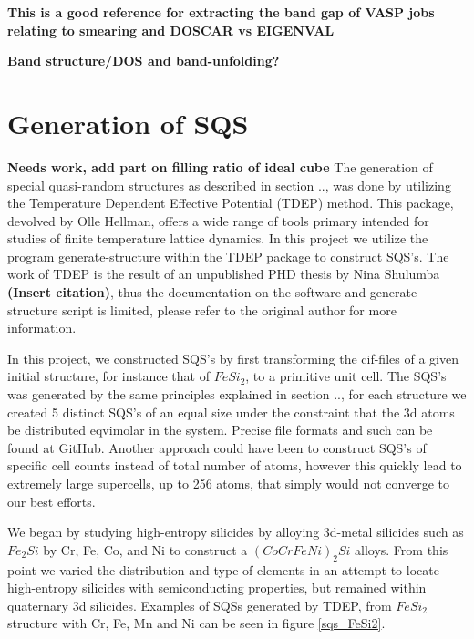 \textbf{This \cite{bandgap_vasp_forum} is a good reference for extracting the band gap of VASP jobs relating to smearing and DOSCAR vs EIGENVAL}

\textbf{Band structure/DOS and band-unfolding?}

\section{Generation of SQS}
\textbf{Needs work, add part on filling ratio of ideal cube}
The generation of special quasi-random structures as described in section .., was done by utilizing the Temperature Dependent Effective Potential (TDEP) method. This package, devolved by Olle Hellman, offers a wide range of tools primary intended for studies of finite temperature lattice dynamics. In this project we utilize the program generate-structure within the TDEP package to construct SQS's. The work of TDEP is the result of an unpublished PHD thesis by Nina Shulumba \textbf{(Insert citation)}, thus the documentation on the software and generate-structure script is limited, please refer to the original author for more information. 

In this project, we constructed SQS's by first transforming the cif-files of a given initial structure, for instance that of $FeSi_2$, to a primitive unit cell. The SQS's was generated by the same principles explained in section .., for each structure we created 5 distinct SQS's of an equal size under the constraint that the 3d atoms be distributed eqvimolar in the system. Precise file formats and such can be found at GitHub. Another approach could have been to construct SQS's of specific cell counts instead of total number of atoms, however this quickly lead to extremely large supercells, up to 256 atoms, that simply would not converge to our best efforts. 

We began by studying high-entropy silicides by alloying 3d-metal silicides such as $Fe_2Si$ by Cr, Fe, Co, and Ni to construct a $(CoCrFeNi)_2Si$ alloys. From this point we varied the distribution and type of elements in an attempt to locate high-entropy silicides with semiconducting properties, but remained within quaternary 3d silicides. Examples of SQSs generated by TDEP, from $FeSi_2$ structure with Cr, Fe, Mn and Ni can be seen in figure \ref{sqs_FeSi2}.

